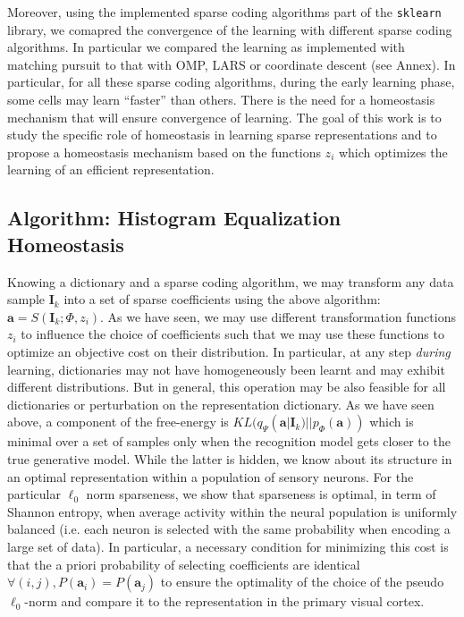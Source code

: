 \documentclass[a4paper, 11pt, draft]{article} %
\newcommand{\coef}{\mathbf{a}} %
\newcommand{\image}{\mathbf{I}} %
\newcommand{\dico}{\Phi} %
\begin{document}
Moreover, using the implemented sparse coding algorithms part of the \verb+sklearn+ library, we comapred the convergence of the learning with different sparse coding algorithms. In particular we compared the learning as implemented with matching pursuit to that with OMP, LARS or coordinate descent (see Annex). 
In particular, for all these sparse coding algorithms, during the early learning phase, some cells may learn ``faster'' than others. There is the need for a homeostasis mechanism that will ensure convergence of learning. The goal of this work is to study the specific role of homeostasis in learning sparse representations and to propose a homeostasis mechanism based on the functions $z_i$ which optimizes the learning of an efficient representation.%
\subsection{Algorithm: Histogram Equalization Homeostasis}\label{HEH}
Knowing a dictionary and a sparse coding algorithm, we may transform any data sample $\image_k$ into a set of sparse coefficients using the above algorithm: $\coef = S(\image_k; \dico, z_i)$. As we have seen, we may use different transformation functions $z_i$ to influence the choice of coefficients such that we may use these functions to optimize an objective cost on their distribution. 
In particular, at any step \emph{during} learning, dictionaries may not have homogeneously been learnt and may exhibit different distributions. But in general, this operation may be also feasible for all dictionaries or perturbation on the representation dictionary.
As we have seen above, a component of the free-energy is $KL( q_\Psi(\coef | \image_k) || p_\dico(\coef) )$ which is minimal over a set of samples only when the recognition model gets closer to the true generative model. While the latter is hidden, we know about its structure in an optimal representation within a population of sensory neurons. For the particular $\ell_0$ norm sparseness, we show that sparseness is optimal, in term of Shannon entropy, when average activity within the neural population is uniformly balanced (i.e. each neuron is selected with the same probability when encoding a large set of data). 
In particular, a necessary condition for minimizing this cost is that the a priori probability of selecting coefficients are identical $\forall (i,j), P(\coef_i)=P(\coef_j)$ to ensure the optimality of the choice of the pseudo $\ell_0$-norm and compare it to the representation in the primary visual cortex. 
\end{document}
